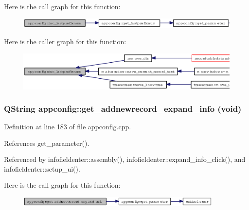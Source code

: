 Here is the call graph for this function:\begin{figure}[H]
\begin{center}
\leavevmode
\includegraphics[width=356pt]{classappconfig_f96423b10ba9101a88de147b1f4fe7bb_cgraph}
\end{center}
\end{figure}


Here is the caller graph for this function:\begin{figure}[H]
\begin{center}
\leavevmode
\includegraphics[width=336pt]{classappconfig_f96423b10ba9101a88de147b1f4fe7bb_icgraph}
\end{center}
\end{figure}
\subsubsection{\setlength{\rightskip}{0pt plus 5cm}QString appconfig::get\_\-addnewrecord\_\-expand\_\-info (void)}\label{classappconfig_5e3fa8839799f2622089946d29a359c8}




Definition at line 183 of file appconfig.cpp.

References get\_\-parameter().

Referenced by infofieldenter::assembly(), infofieldenter::expand\_\-info\_\-click(), and infofieldenter::setup\_\-ui().

Here is the call graph for this function:\begin{figure}[H]
\begin{center}
\leavevmode
\includegraphics[width=291pt]{classappconfig_5e3fa8839799f2622089946d29a359c8_cgraph}
\end{center}
\end{figure}


